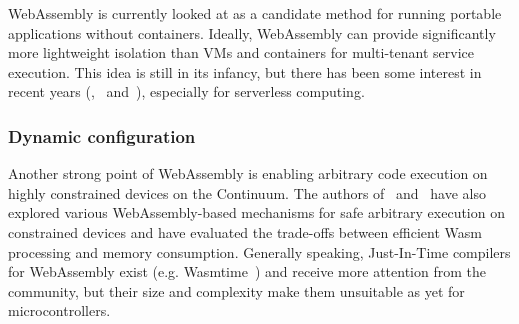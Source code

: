 


WebAssembly is currently looked at as a candidate method for running portable applications without containers. Ideally, WebAssembly can provide significantly more lightweight isolation than VMs and containers for multi-tenant service execution. This idea is still in its infancy, but there has been some interest in recent years (\cite{hall2019execution},~\cite{gadepalli2020sledge} and~\cite{shillaker2020faasm}), especially for serverless computing.

\subsubsection{Dynamic configuration}

Another strong point of WebAssembly is enabling arbitrary code execution on highly constrained devices on the Continuum. The authors of~\cite{10.1007/978-3-030-29897-5_33} and~\cite{peach2020ewasm} have also explored various WebAssembly-based mechanisms for safe arbitrary execution on constrained devices and have evaluated the trade-offs between efficient Wasm processing and memory consumption. Generally speaking, Just-In-Time compilers for WebAssembly exist (e.g. Wasmtime~\cite{wasmtime}) and receive more attention from the community, but their size and complexity make them unsuitable as yet for microcontrollers.

